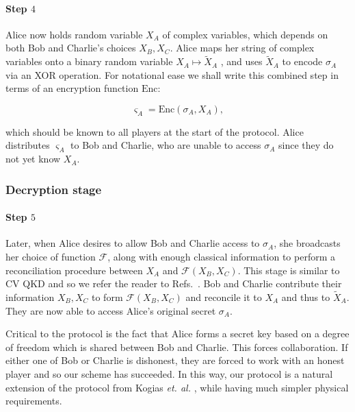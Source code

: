 \paragraph{Step $4$} Alice now holds random variable $X_A$ of complex variables, which depends on both Bob and Charlie's choices $X_B, X_C$. Alice maps her string of complex variables onto a binary random variable $X_A \mapsto \tilde{X}_A$ \cite{Diamanti2015}, and uses $\tilde{X}_A$ to encode $\sigma_A$ via an XOR operation. For notational ease we shall write this combined step in terms of an encryption function $\text{Enc}$:  %

\begin{equation}
\varsigma_A = \text{Enc}\left(\sigma_A, X_A\right),
\end{equation} %

\noindent which should be known to all players at the start of the protocol. Alice distributes $\varsigma_A$ to Bob and Charlie, who are unable to access $\sigma_A$ since they do not yet know $X_A$.

\subsubsection*{Decryption stage}

\paragraph{Step $5$} Later, when Alice desires to allow Bob and Charlie access to $\sigma_A$, she broadcasts her choice of function $\mathcal{F}$, along with enough classical information to perform a reconciliation procedure between $X_A$ and $\mathcal{F}\left(X_B, X_C\right)$. This stage is similar to CV QKD and so we refer the reader to Refs.~\cite{Diamanti2015, Laudenbach2017}. Bob and Charlie contribute their information $X_B, X_C$ to form $\mathcal{F}\left(X_B, X_C\right)$ and reconcile it to $X_A$ and thus to $\tilde{X}_A$. They are now able to access Alice's original secret $\sigma_A$.

Critical to the protocol is the fact that Alice forms a secret key based on a degree of freedom which is shared between Bob and Charlie. This forces collaboration. If either one of Bob or Charlie is dishonest, they are forced to work with an honest player and so our scheme has succeeded. In this way, our protocol is a natural extension of the protocol from Kogias \emph{et. al.} \cite{Kogias2017}, while having much simpler physical requirements.



